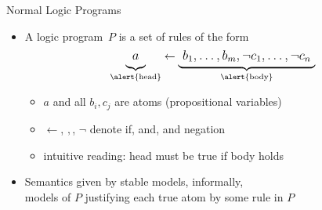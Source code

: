 \begin{frame}{Normal Logic Programs}
  \begin{itemize}
  \item
    A \alert{logic program}~$P$ is a \alert{set of rules} of the form
    \[\large
    \underbrace{a\raisebox{-4pt}{}}_{\text{\alert{head}}}\leftarrow\underbrace{\raisebox{-4pt}{\ }b_1,\dots,b_m,\neg{c_1},\dots,\neg{c_n}\raisebox{-4pt}{\ }}_{\alert{\text{body}}}
    \]
    \begin{itemize}
    \item $a$ and all $b_i,c_j$ are \alert{atoms} (propositional variables)
    \item \alert{$\leftarrow$}, \alert{$,$}, \alert{$\neg$} denote \alert{if}, \alert{and}, and \alert{negation}
    \item intuitive reading: \alert{head} must be true \alert{if body} holds
    \end{itemize}
    \medskip
  \item
    Semantics given by \alert{stable models}, informally,\\
    models of $P$ justifying each true atom by some rule in $P$
  \end{itemize}
\end{frame}
%

